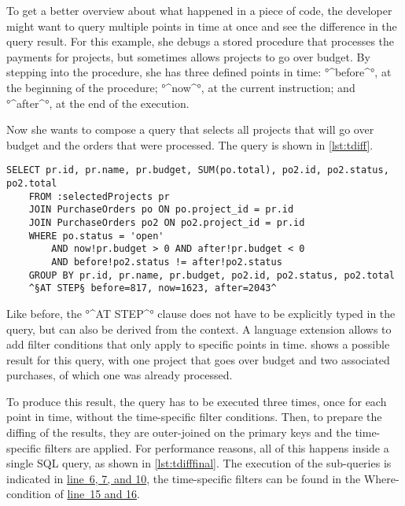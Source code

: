 \documentclass[english]{sig-alternate-05-2015}
\newcommand{\todo}[2][]{\pdfmargincomment[author={#1}]{#2}}
\newcommand{\linerefn}[2]{\hyperref[#1]{line~#2}}
\begin{document}
To get a better overview about what happened in a piece of code, the developer might want to query multiple points in time at once and see the difference in the query result.
For this example, she debugs a stored procedure that processes the payments for projects, but sometimes allows projects to go over budget.
By stepping into the procedure, she has three defined points in time: °^before^°, at the beginning of the procedure; °^now^°, at the current instruction; and °^after^°, at the end of the execution.

Now she wants to compose a query that selects all projects that will go over budget and the orders that were processed.
\todo{explain query rewriting}
The query is shown in \cref{lst:tdiff}.
\begin{lstlisting}[language=HanaSQL,float=b,caption={Example of a time-diff query: "Select all projects that will go over budget and their respective purchase orders"},label=lst:tdiff]
	SELECT pr.id, pr.name, pr.budget, SUM(po.total), po2.id, po2.status, po2.total
	FROM :selectedProjects pr
	JOIN PurchaseOrders po ON po.project_id = pr.id
	JOIN PurchaseOrders po2 ON po2.project_id = pr.id
	WHERE po.status = 'open'
		AND now!pr.budget > 0 AND after!pr.budget < 0
		AND before!po2.status != after!po2.status
	GROUP BY pr.id, pr.name, pr.budget, po2.id, po2.status, po2.total
	^§AT STEP§ before=817, now=1623, after=2043^
\end{lstlisting}
Like before, the °^AT STEP^° clause does not have to be explicitly typed in the query, but can also be derived from the context.
A language extension allows to add filter conditions that only apply to specific points in time.
 shows a possible result for this query, with one project that goes over budget and two associated purchases, of which one was already processed.

To produce this result, the query has to be executed three times, once for each point in time, without the time-specific filter conditions.
Then, to prepare the diffing of the results, they are outer-joined on the primary keys and the time-specific filters are applied.
For performance reasons, all of this happens inside a single SQL query, as shown in \cref{lst:tdifffinal}.
The execution of the sub-queries is indicated in \linerefn{lst:tdifffinal}{6, 7, and 10}, the time-specific filters can be found in the Where-condition of \linerefn{lst:tdifffinal}{15 and 16}.
\end{document}

